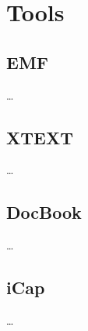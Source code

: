 
\chapter{Tools}
\label{ch:Tools}

\section{EMF}
\label{ch:Tools:sec:Section1}

\dots

\section{XTEXT}
\label{ch:Tools:sec:Section2}

\dots

\section{DocBook}
\label{ch:Tools:sec:Section3}

\dots

\section{iCap}
\label{ch:Tools:sec:Section4}

\dots
